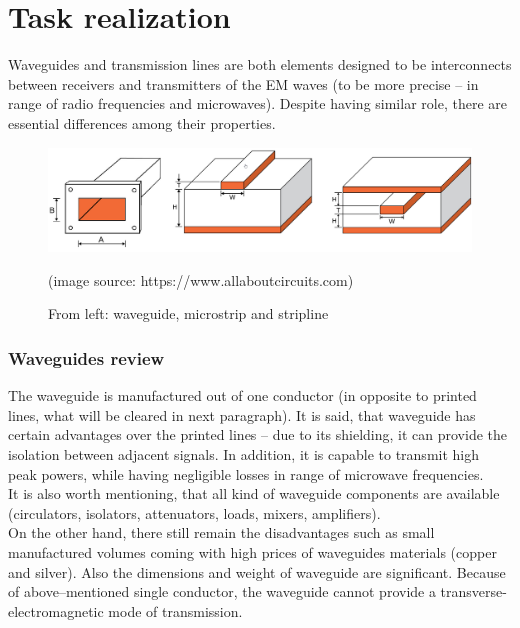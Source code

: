 \documentclass[eng,printmode]{mgr}
\begin{document}
\section{Task realization}
Waveguides and transmission lines are both elements designed to be interconnects between receivers and transmitters of the EM waves (to be more precise -- in range of radio frequencies and microwaves). Despite having similar role, there are essential differences among their properties.

\begin{figure}[h]
	\centering
	\includegraphics[width=0.8\linewidth]{technology}
	\caption{From left: waveguide, microstrip and stripline} (image source: https://www.allaboutcircuits.com)
	\label{fig:technology}
\end{figure}

	

\subsubsection{Waveguides review }
The waveguide is manufactured out of one conductor (in opposite to printed lines, what will be cleared in next paragraph). It is said, that waveguide has certain advantages over the printed lines
-- due to its shielding, it can provide the isolation between adjacent signals. In addition, it is capable to transmit high peak powers, while having negligible losses in range of microwave frequencies.\\
It is also worth mentioning, that all kind of waveguide components are available (circulators, isolators, attenuators, loads, mixers, amplifiers).
\\
On the other hand, there still remain the disadvantages such as small manufactured volumes coming with high prices of waveguides materials (copper and silver). Also the dimensions and weight of waveguide are significant. Because of above--mentioned single conductor, the waveguide cannot provide a transverse-electromagnetic mode of transmission.
\end{document}
